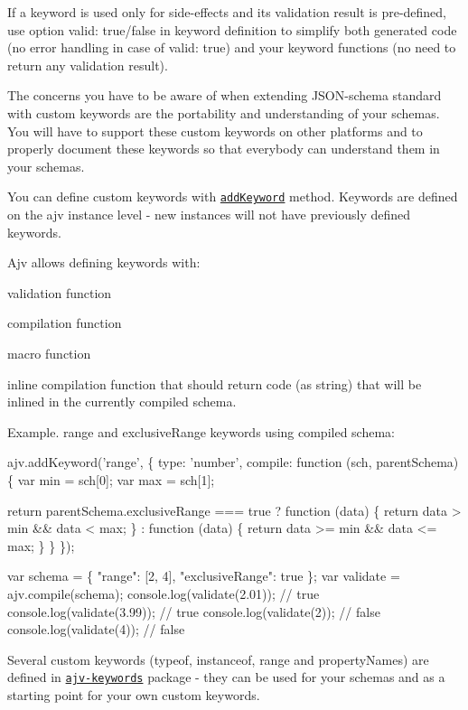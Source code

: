If a keyword is used only for side-\/effects and its validation result is pre-\/defined, use option {\ttfamily valid\+: true/false} in keyword definition to simplify both generated code (no error handling in case of {\ttfamily valid\+: true}) and your keyword functions (no need to return any validation result).

The concerns you have to be aware of when extending J\+S\+O\+N-\/schema standard with custom keywords are the portability and understanding of your schemas. You will have to support these custom keywords on other platforms and to properly document these keywords so that everybody can understand them in your schemas.

You can define custom keywords with \href{#api-addkeyword}{\tt add\+Keyword} method. Keywords are defined on the {\ttfamily ajv} instance level -\/ new instances will not have previously defined keywords.

Ajv allows defining keywords with\+:
\begin{DoxyItemize}
\item validation function
\item compilation function
\item macro function
\item inline compilation function that should return code (as string) that will be inlined in the currently compiled schema.
\end{DoxyItemize}

Example. {\ttfamily range} and {\ttfamily exclusive\+Range} keywords using compiled schema\+:


\begin{DoxyCode}
ajv.addKeyword('range', \{ type: 'number', compile: function (sch, parentSchema) \{
  var min = sch[0];
  var max = sch[1];

  return parentSchema.exclusiveRange === true
          ? function (data) \{ return data > min && data < max; \}
          : function (data) \{ return data >= min && data <= max; \}
\} \});

var schema = \{ "range": [2, 4], "exclusiveRange": true \};
var validate = ajv.compile(schema);
console.log(validate(2.01)); // true
console.log(validate(3.99)); // true
console.log(validate(2)); // false
console.log(validate(4)); // false
\end{DoxyCode}


Several custom keywords (typeof, instanceof, range and property\+Names) are defined in \href{https://github.com/epoberezkin/ajv-keywords}{\tt ajv-\/keywords} package -\/ they can be used for your schemas and as a starting point for your own custom keywords.

